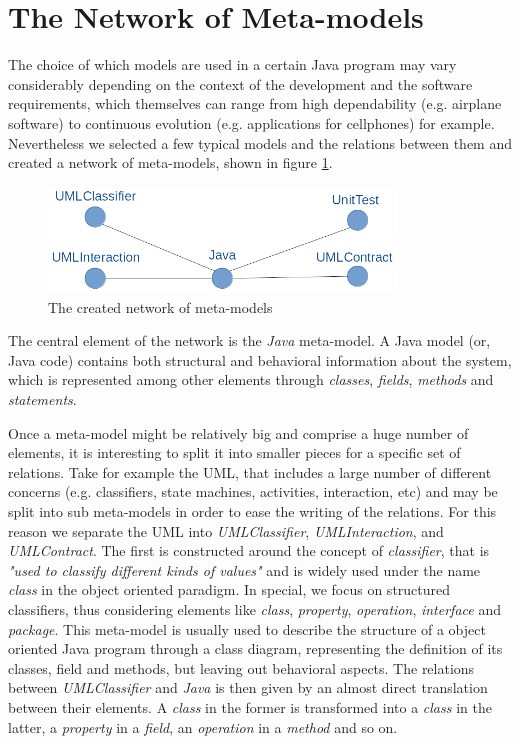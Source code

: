 \documentclass[tuberlin,cic,tc,english,noabntcite]{iiufrgs}
\begin{document}
\section{The Network of Meta-models}
The choice of which models are used in a certain Java program may vary considerably depending on the context of the development and the software requirements, which themselves can range from high dependability (e.g. airplane software) to continuous evolution (e.g. applications for cellphones) for example. Nevertheless we selected a few typical models and the relations between them and created a network of meta-models, shown in figure \ref{fig:network_metamodels}.

\begin{figure}[h]
    \caption{The created network of meta-models}
    \begin{center}
        \includegraphics[width=25em]{network_metamodels}
    \end{center}
    \label{fig:network_metamodels}
\end{figure}

The central element of the network is the \emph{Java} meta-model. A Java model (or, Java code) contains both structural and behavioral information about the system, which is represented among other elements through \emph{classes}, \emph{fields}, \emph{methods} and \emph{statements}.

Once a meta-model might be relatively big and comprise a huge number of elements, it is interesting to split it into smaller pieces for a specific set of relations. Take for example the UML, that includes a large number of different concerns (e.g. classifiers, state machines, activities, interaction, etc) and may be split into sub meta-models in order to ease the writing of the relations. For this reason we separate the UML into \emph{UMLClassifier}, \emph{UMLInteraction}, and \emph{UMLContract}. The first is constructed around the concept of \emph{classifier}, that is \emph{"used to classify different kinds of values"} \citep[p. 97]{omg2007unified} and is widely used under the name \emph{class} in the object oriented paradigm. In special, we focus on structured classifiers, thus considering elements like \emph{class}, \emph{property}, \emph{operation}, \emph{interface} and \emph{package}. This meta-model is usually used to describe the structure of a object oriented Java program through a class diagram, representing the definition of its classes, field and methods, but leaving out behavioral aspects. The relations between \emph{UMLClassifier} and \emph{Java} is then given by an almost direct translation between their elements. A \emph{class} in the former is transformed into a \emph{class} in the latter, a \emph{property} in a \emph{field}, an \emph{operation} in a \emph{method} and so on.
\end{document}
